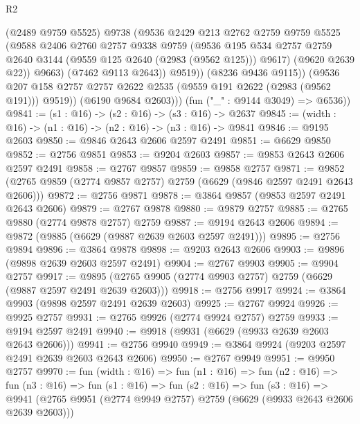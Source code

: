 \begin{lexlean}{R2}
\begin{coremodule}
                    (@2489 @9759 @5525)
                    @9738
                    (@9536
                      @2429
                      @213
                      @2762
                      @2759
                      @9759
                      @5525
                      (@9588
                        @2406
                        @2760
                        @2757
                        @9338
                        @9759
                        (@9536
                          @195
                          @534
                          @2757
                          @2759
                          @2640
                          @3144
                          (@9559 @125 @2640 (@2983 (@9562 @125)))
                          @9617)
                        (@9620 @2639 @22))
                      @9663)
                    (@7462 @9113 @2643))
                  @9519))
              (@8236 @9436 @9115))
            (@9536 @207 @158 @2757 @2757 @2622 @2535 (@9559 @191 @2622 (@2983 (@9562 @191))) @9519))
          (@6190 @9684 @2603)))
      (fun ("_" : @9144 @3049) => @6536))
@9841 := (s1 : @16) -> (s2 : @16) -> (s3 : @16) -> @2637
@9845 := (width : @16) -> (n1 : @16) -> (n2 : @16) -> (n3 : @16) -> @9841
@9846 := @9195 @2603
@9850 := @9846 @2643 @2606 @2597 @2491
@9851 := @6629 @9850
@9852 := @2756 @9851
@9853 := @9204 @2603
@9857 := @9853 @2643 @2606 @2597 @2491
@9858 := @2767 @9857
@9859 := @9858 @2757
@9871 := @9852 (@2765 @9859 (@2774 @9857 @2757) @2759 (@6629 (@9846 @2597 @2491 @2643 @2606)))
@9872 := @2756 @9871
@9878 := @3864 @9857 (@9853 @2597 @2491 @2643 @2606)
@9879 := @2767 @9878
@9880 := @9879 @2757
@9885 := @2765 @9880 (@2774 @9878 @2757) @2759
@9887 := @9194 @2643 @2606
@9894 := @9872 (@9885 (@6629 (@9887 @2639 @2603 @2597 @2491)))
@9895 := @2756 @9894
@9896 := @3864 @9878
@9898 := @9203 @2643 @2606
@9903 := @9896 (@9898 @2639 @2603 @2597 @2491)
@9904 := @2767 @9903
@9905 := @9904 @2757
@9917 := @9895 (@2765 @9905 (@2774 @9903 @2757) @2759 (@6629 (@9887 @2597 @2491 @2639 @2603)))
@9918 := @2756 @9917
@9924 := @3864 @9903 (@9898 @2597 @2491 @2639 @2603)
@9925 := @2767 @9924
@9926 := @9925 @2757
@9931 := @2765 @9926 (@2774 @9924 @2757) @2759
@9933 := @9194 @2597 @2491
@9940 := @9918 (@9931 (@6629 (@9933 @2639 @2603 @2643 @2606)))
@9941 := @2756 @9940
@9949 := @3864 @9924 (@9203 @2597 @2491 @2639 @2603 @2643 @2606)
@9950 := @2767 @9949
@9951 := @9950 @2757
@9970 := fun (width : @16) =>
  fun (n1 : @16) =>
  fun (n2 : @16) =>
  fun (n3 : @16) =>
  fun (s1 : @16) =>
  fun (s2 : @16) =>
  fun (s3 : @16) =>
  @9941 (@2765 @9951 (@2774 @9949 @2757) @2759 (@6629 (@9933 @2643 @2606 @2639 @2603)))

\end{coremodule}
\end{lexlean}
